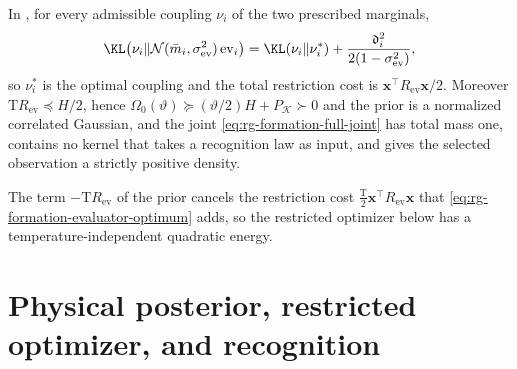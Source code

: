 In , for every admissible coupling
\(\nu_i\) of the two prescribed marginals,
\begin{equation}
\KL\bigl(\nu_i\Vert
  \mathcal N(\bar m_i,\sigma^2_{\mathrm{ev}})\operatorname{ev}_i\bigr)
=\KL(\nu_i\Vert\nu_i^*)+\frac{\mathfrak d_i^2}{2(1-\sigma^2_{\mathrm{ev}})},
\label{eq:rg-formation-evaluator-optimum}
\end{equation}
so \(\nu_i^*\) is the optimal coupling and the total restriction cost is
\(\mathbf x^\top R_{\mathrm{ev}}\mathbf x/2\). Moreover
\(\mathrm TR_{\mathrm{ev}}\preceq H/2\), hence
\(\Omega_0(\vartheta)\succeq(\vartheta/2)H+P_{\mathcal K}\succ0\) and the prior
is a normalized correlated Gaussian, and the joint
\cref{eq:rg-formation-full-joint} has total mass one, contains no kernel that
takes a recognition law as input, and gives the selected observation a
strictly positive density. 

The term \(-\mathrm TR_{\mathrm{ev}}\) of the prior cancels the restriction
cost \(\tfrac{\mathrm T}2\mathbf x^\top R_{\mathrm{ev}}\mathbf x\) that
\cref{eq:rg-formation-evaluator-optimum} adds, so the restricted optimizer
below has a temperature-independent quadratic energy.

\section{Physical posterior, restricted optimizer, and recognition}
\label{sec:rg-formation-laws}

